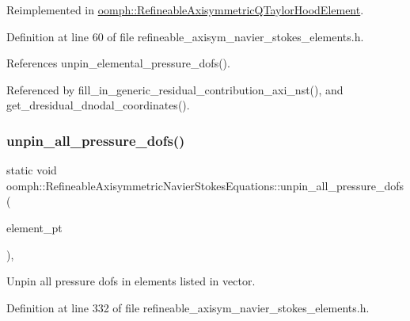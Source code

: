 Reimplemented in \hyperlink{classoomph_1_1RefineableAxisymmetricQTaylorHoodElement_a1d0228372441c2332b9fed4fd1ad44ad}{oomph\+::\+Refineable\+Axisymmetric\+Q\+Taylor\+Hood\+Element}.



Definition at line 60 of file refineable\+\_\+axisym\+\_\+navier\+\_\+stokes\+\_\+elements.\+h.



References unpin\+\_\+elemental\+\_\+pressure\+\_\+dofs().



Referenced by fill\+\_\+in\+\_\+generic\+\_\+residual\+\_\+contribution\+\_\+axi\+\_\+nst(), and get\+\_\+dresidual\+\_\+dnodal\+\_\+coordinates().

\mbox{\label{classoomph_1_1RefineableAxisymmetricNavierStokesEquations_a0d72740a87fa729222ebbf9af2ed0b1f}} 
\subsubsection{\texorpdfstring{unpin\+\_\+all\+\_\+pressure\+\_\+dofs()}{unpin\_all\_pressure\_dofs()}}
{\footnotesize\ttfamily static void oomph\+::\+Refineable\+Axisymmetric\+Navier\+Stokes\+Equations\+::unpin\+\_\+all\+\_\+pressure\+\_\+dofs (\begin{DoxyParamCaption}\item[{const \hyperlink{classoomph_1_1Vector}{Vector}$<$ \hyperlink{classoomph_1_1GeneralisedElement}{Generalised\+Element} $\ast$$>$ \&}]{element\+\_\+pt }\end{DoxyParamCaption})\hspace{0.3cm}{\ttfamily [inline]}, {\ttfamily [static]}}



Unpin all pressure dofs in elements listed in vector. 



Definition at line 332 of file refineable\+\_\+axisym\+\_\+navier\+\_\+stokes\+\_\+elements.\+h.




